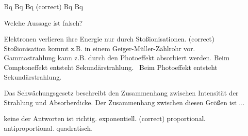 \documentclass[11pt]{exam}
\begin{document}
\begin{questions}
\begin{choices}
	 Bq
	 Bq
	 Bq (correct)
	 Bq
	 Bq
\end{choices}

\vspace{3mm}\question Welche Aussage ist falsch?

\begin{choices}
	\choice Elektronen verlieren ihre Energie nur durch Stoßionisationen. (correct)
	\choice Stoßionisation kommt z.B. in einem Geiger-Müller-Zählrohr vor.
	\choice Gammastrahlung kann z.B. durch den Photoeffekt absorbiert werden.
	\choice Beim Comptoneffekt entsteht Sekundärstrahlung.
	\choice  Beim Photoeffekt entsteht Sekundärstrahlung.
\end{choices}

\vspace{3mm}\question Das Schwächungsgesetz beschreibt den Zusammenhang zwischen Intensität der Strahlung und Absorberdicke. Der Zusammenhang zwischen diesen Größen ist ...

\begin{choices}
	\choice keine der Antworten ist richtig.
	\choice exponentiell. (correct)
	\choice proportional.
	\choice antiproportional.
	\choice quadratisch.
\end{choices}

\vspace{3mm}\end{questions}
\end{document}
